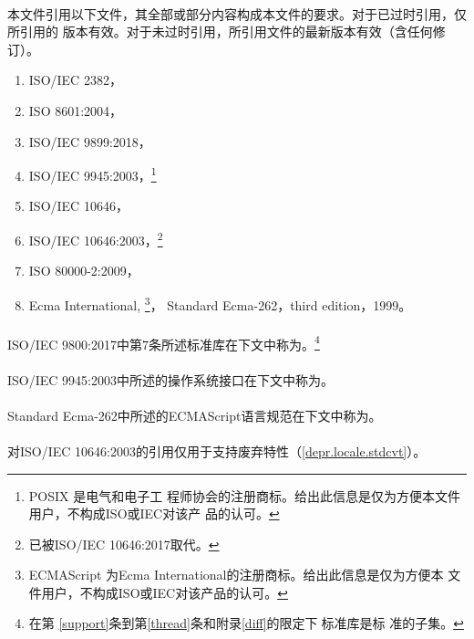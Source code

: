 \paragraph{} %
本文件引用以下文件，其全部或部分内容构成本文件的要求。对于已过时引用，仅所引用的
版本有效。对于未过时引用，所引用文件的最新版本有效（含任何修订）。
\begin{enumerate}
  \item ISO/IEC 2382，
  \item ISO 8601:2004，
  \item ISO/IEC 9899:2018，
  \item ISO/IEC 9945:2003，\footnote{POSIX \textregistered{}是电气和电子工
        程师协会的注册商标。给出此信息是仅为方便本文件用户，不构成ISO或IEC对该产
        品的认可。}
  \item ISO/IEC 10646，
  \item ISO/IEC 10646:2003，\footnote{已被ISO/IEC 10646:2017取代。}
  \item ISO 80000-2:2009，
  \item Ecma International,  \footnote{ECMAScript
        \textregistered{}为Ecma International的注册商标。给出此信息是仅为方便本
        文件用户，不构成ISO或IEC对该产品的认可。}，
        Standard Ecma-262，third edition，1999。
\end{enumerate}

\paragraph{} %
ISO/IEC 9800:2017中第7条所述标准库在下文中称为。\footnote{在第
\ref{support}条到第\ref{thread}条和附录\ref{diff}的限定下，\c{}标准库是\cpp{}标
准的子集。}

\paragraph{} %
ISO/IEC 9945:2003中所述的操作系统接口在下文中称为。

\paragraph{} %
Standard Ecma-262中所述的ECMAScript语言规范在下文中称为。

\paragraph{} %
\begin{note}
  对ISO/IEC 10646:2003的引用仅用于支持废弃特性（\ref{depr.locale.stdcvt}）。
\end{note}
